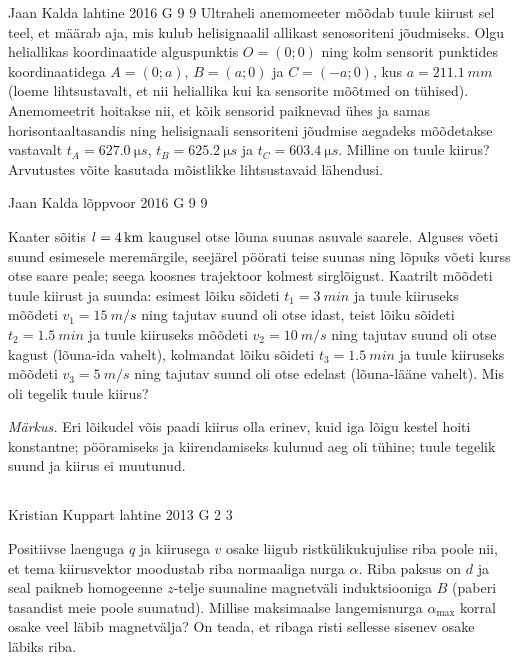 \documentclass[11pt]{article}
\begin{document}
{%
{Jaan Kalda} %
{lahtine} %
{2016} %
{G 9} %
{9} %
{
\ifStatement
Ultraheli anemomeeter mõõdab tuule kiirust sel teel, et määrab aja, mis kulub helisignaalil allikast senosoriteni jõudmiseks.
Olgu heliallikas koordinaatide alguspunktis $O=(0;0)$ ning kolm sensorit punktides koordinaatidega $A=(0;a)$, $B=(a;0)$ ja $C=(-a;0)$, 
kus $a=\SI{211.1}{mm}$ (loeme lihtsustavalt, et nii heliallika kui ka sensorite mõõtmed on tühised). 
Anemomeetrit hoitakse nii, et kõik sensorid paiknevad ühes ja samas horisontaaltasandis ning helisignaali 
sensoriteni jõudmise aegadeks mõõdetakse vastavalt $t_A=\SI{627,0}{\micro s}$, $t_B=\SI{625,2}{\micro s}$ ja $t_C=\SI{603,4}{\micro s}$. 
Milline on tuule kiirus? Arvutustes võite kasutada mõistlikke lihtsustavaid lähendusi.
\fi
}

{Jaan Kalda} %
{lõppvoor} %
{2016} %
{G 9} %
{9} %
{
\ifStatement
Kaater sõitis $l=\SI 4{km}$ kaugusel otse lõuna suunas asuvale saarele. 
Alguses võeti suund esimesele meremärgile, seejärel pöörati teise suunas ning lõpuks võeti kurss otse saare peale; seega koosnes trajektoor kolmest sirglõigust. Kaatrilt mõõdeti tuule kiirust ja suunda: esimest lõiku sõideti $t_1=\SI{3}{min}$ ja tuule kiiruseks mõõdeti $v_1=\SI{15}{m/s}$ ning tajutav suund oli otse idast, teist lõiku sõideti $t_2=\SI{1,5}{min}$ ja tuule kiiruseks mõõdeti $v_2=\SI{10}{m/s}$ ning tajutav suund oli otse kagust (lõuna-ida vahelt), kolmandat lõiku sõideti $t_3=\SI{1,5}{min}$ ja tuule kiiruseks mõõdeti $v_3=\SI{5}{m/s}$ ning tajutav suund oli otse edelast (lõuna-lääne vahelt). Mis oli tegelik tuule kiirus?

\emph{Märkus.} Eri lõikudel võis paadi kiirus olla erinev, kuid iga lõigu kestel hoiti konstantne; pööramiseks ja kiirendamiseks kulunud aeg oli tühine; tuule tegelik suund ja kiirus ei muutunud. 
\fi
}
\newpage\subsection{\protect{}}

{Kristian Kuppart} %
{lahtine} %
{2013} %
{G 2} %
{3} %
{
\ifStatement
Positiivse laenguga $q$ ja kiirusega $v$ osake liigub ristkülikukujulise riba poole nii, et tema kiirusvektor
moodustab riba normaaliga nurga $\alpha$. Riba paksus on $d$ ja seal paikneb
homogeenne $z$-telje suunaline
magnetväli induktsiooniga $B$ (paberi tasandist meie poole suunatud). Millise maksimaalse
langemisnurga $\alpha_{\mathrm{max}}$ korral
osake veel läbib magnetvälja? On teada, et ribaga risti sellesse sisenev osake
läbiks riba.

}}
\end{document}
